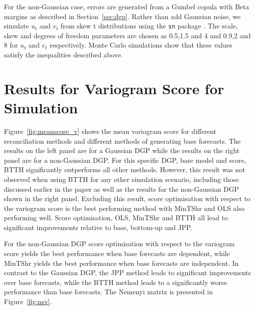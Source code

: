 \documentclass[a4paper,12pt]{article}
\theoremstyle{definition}
\begin{document}
For the non-Gaussian case, errors are generated from a Gumbel copula with Beta margins as described in Section~\ref{sec:dgp}. Rather than add Gaussian noise, we simulate $u_t$ and $v_t$ from skew t distributions using the \texttt{sn} package \citep{snpackage}. The scale, skew and degrees of freedom parameters are chosen as 0.5,1.5 and 4 and 0.9,2 and 8 for $u_t$ and $v_t$ respectively. Monte Carlo simulations show that these values satisfy the inequalities described above.

\section{Results for Variogram Score for Simulation}\label{app:nemenyi}

Figure~\ref{fig:meanscore_v} shows the mean variogram score for different reconciliation methods and different methods of generating base forecasts. The results on the left panel are for a Gaussian DGP while the results on the right panel are for a non-Gaussian DGP.  For this specific DGP, base model and score, BTTH significantly outperforms all other methods. However, this result was not observed when using BTTH for any other simulation scenario, including those discussed earlier in the paper as well as the results for the non-Gaussian DGP shown in the right panel. Excluding this result, score optimisation with respect to the variogram score is the best performing method with MinTShr and OLS also performing well. Score optimisation, OLS, MinTShr and BTTH all lead to significant improvements relative to base, bottom-up and JPP.

For the non-Gaussian DGP score optimisation with respect to the variogram score yields the best performance when base forecasts are dependent, while MinTShr yields the best performance when base forecasts are independent. In contrast to the Gaussian DGP, the JPP method leads to significant improvements over base forecasts, while the BTTH method leads to a significantly worse performance than base forecasts. The Nemenyi matrix is presented in Figure~\ref{fig:nsv}.
\end{document}
